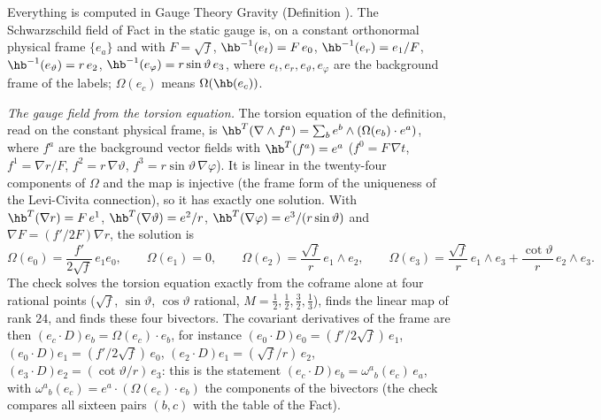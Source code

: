 Everything is computed in Gauge Theory Gravity (Definition ). The Schwarzschild field of Fact  in the static gauge is, on a constant orthonormal physical frame $\{e_{a}\}$ and with $F = \sqrt f$, $\hb^{-1}(e_{t}) = F\,e_{0}$, $\hb^{-1}(e_{r}) = e_{1}/F$, $\hb^{-1}(e_{\vartheta}) = r\,e_{2}$, $\hb^{-1}(e_{\varphi}) = r\sin\vartheta\,e_{3}$, where $e_{t}, e_{r}, e_{\vartheta}, e_{\varphi}$ are the background frame of the labels; $\Omega(e_{c})$ means $\Omega(\hb(e_{c}))$.

\emph{The gauge field from the torsion equation.} The torsion equation of the definition, read on the constant physical frame, is $\hb^{T}(\nabla\wedge f^{a}) = \sum_{b} e^{b}\wedge(\Omega(e_{b})\cdot e^{a})$, where $f^{a}$ are the background vector fields with $\hb^{T}(f^{a}) = e^{a}$ ($f^{0} = F\,\nabla t$, $f^{1} = \nabla r/F$, $f^{2} = r\,\nabla\vartheta$, $f^{3} = r\sin\vartheta\,\nabla\varphi$). It is linear in the twenty-four components of $\Omega$ and the map is injective (the frame form of the uniqueness of the Levi-Civita connection), so it has exactly one solution. With $\hb^{T}(\nabla r) = F\,e^{1}$, $\hb^{T}(\nabla\vartheta) = e^{2}/r$, $\hb^{T}(\nabla\varphi) = e^{3}/(r\sin\vartheta)$ and $\nabla F = (f'/2F)\nabla r$, the solution is
\[
\Omega(e_{0}) = \frac{f'}{2\sqrt f}\,e_{1}e_{0}, \qquad \Omega(e_{1}) = 0, \qquad \Omega(e_{2}) = \frac{\sqrt f}{r}\,e_{1}\wedge e_{2}, \qquad \Omega(e_{3}) = \frac{\sqrt f}{r}\,e_{1}\wedge e_{3} + \frac{\cot\vartheta}{r}\,e_{2}\wedge e_{3}.
\]
The check solves the torsion equation exactly from the coframe alone at four rational points ($\sqrt f$, $\sin\vartheta$, $\cos\vartheta$ rational, $M = \tfrac12, \tfrac12, \tfrac32, \tfrac13$), finds the linear map of rank $24$, and finds these four bivectors. The covariant derivatives of the frame are then $(e_{c}\cdot D)e_{b} = \Omega(e_{c})\cdot e_{b}$, for instance $(e_{0}\cdot D)e_{0} = (f'/2\sqrt f)\,e_{1}$, $(e_{0}\cdot D)e_{1} = (f'/2\sqrt f)\,e_{0}$, $(e_{2}\cdot D)e_{1} = (\sqrt f/r)\,e_{2}$, $(e_{3}\cdot D)e_{2} = (\cot\vartheta/r)\,e_{3}$: this is the statement $(e_{c}\cdot D)e_{b} = \omega^{a}{}_{b}(e_{c})\,e_{a}$, with $\omega^{a}{}_{b}(e_{c}) = e^{a}\cdot(\Omega(e_{c})\cdot e_{b})$ the components of the bivectors (the check compares all sixteen pairs $(b, c)$ with the table of the Fact).

